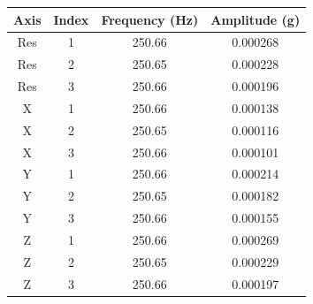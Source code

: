\begin{tabular}{cccc}
\hline
Axis & Index & Frequency (Hz) & Amplitude (g) \\
\hline
Res & 1 & 250.66 & 0.000268 \\
Res & 2 & 250.65 & 0.000228 \\
Res & 3 & 250.66 & 0.000196 \\
X & 1 & 250.66 & 0.000138 \\
X & 2 & 250.65 & 0.000116 \\
X & 3 & 250.66 & 0.000101 \\
Y & 1 & 250.66 & 0.000214 \\
Y & 2 & 250.65 & 0.000182 \\
Y & 3 & 250.66 & 0.000155 \\
Z & 1 & 250.66 & 0.000269 \\
Z & 2 & 250.65 & 0.000229 \\
Z & 3 & 250.66 & 0.000197 \\
\hline
\end{tabular}